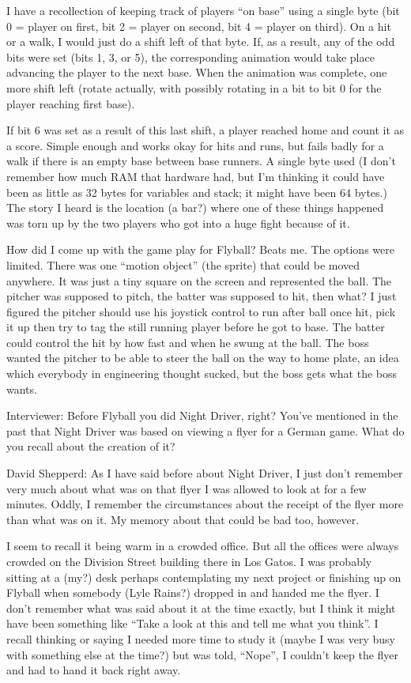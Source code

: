 I have a recollection of keeping track of players “on base” using a single byte (bit 0 = player on first, bit 2 = player on second, bit 4 = player on third). On a hit or a walk, I would just do a shift left of that byte. If, as a result, any of the odd bits were set (bits 1, 3, or 5), the corresponding animation would take place advancing the player to the next base. When the animation was complete, one more shift left (rotate actually, with possibly rotating in a bit to bit 0 for the player reaching first base). 

If bit 6 was set as a result of this last shift, a player reached home and count it as a score. Simple enough and works okay for hits and runs, but fails badly for a walk if there is an empty base between base runners. A single byte used (I don't remember how much RAM that hardware had, but I'm thinking it could have been as little as 32 bytes for variables and stack; it might have been 64 bytes.) The story I heard is the location (a bar?) where one of these things happened was torn up by the two players who got into a huge fight because of it.

How did I come up with the game play for Flyball? Beats me. The options were limited. There was one “motion object” (the sprite) that could be moved anywhere. It was just a tiny square on the screen and represented the ball. The pitcher was supposed to pitch, the batter was supposed to hit, then what? I just figured the pitcher should use his joystick control to run after ball once hit, pick it up then try to tag the still running player before he got to base. The batter could control the hit by how fast and when he swung at the ball. The boss wanted the pitcher to be able to steer the ball on the way to home plate, an idea which everybody in engineering thought sucked, but the boss gets what the boss wants.

\textcolor{interviewer}{Interviewer:} Before Flyball you did Night Driver, right? You’ve mentioned in the past that Night Driver was based on viewing a flyer for a German game. What do you recall about the creation of it?

\textcolor{interviewee} {David Shepperd:} As I have said before about Night Driver, I just don't remember very much about what was on that flyer I was allowed to look at for a few minutes. Oddly, I remember the circumstances about the receipt of the flyer more than what was on it. My memory about that could be bad too, however. 

I seem to recall it being warm in a crowded office. But all the offices were always crowded on the Division Street building there in Los Gatos. I was probably sitting at a (my?) desk perhaps contemplating my next project or finishing up on Flyball when somebody (Lyle Rains?) dropped in and handed me the flyer. I don't remember what was said about it at the time exactly, but I think it might have been something like “Take a look at this and tell me what you think”. I recall thinking or saying I needed more time to study it (maybe I was very busy with something else at the time?) but was told, “Nope”, I couldn't keep the flyer and had to hand it back right away. 

